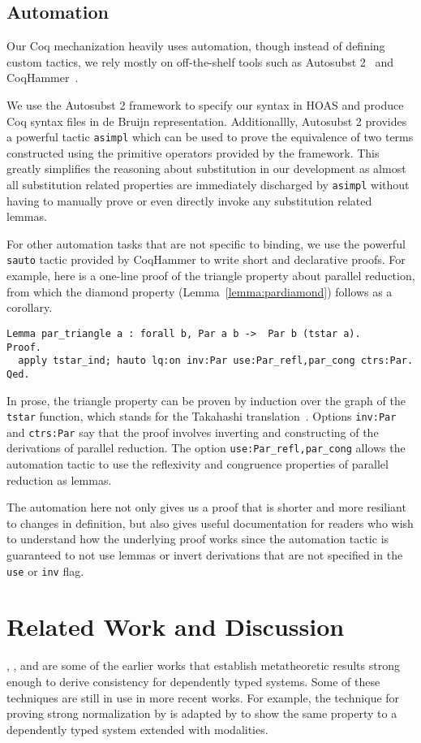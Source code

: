\documentclass[acmsmall]{acmart}
\begin{document}
\subsection{Automation}
\label{sec:automation}
Our Coq mechanization heavily uses automation, though instead of
defining custom tactics, we rely mostly on off-the-shelf tools such as
Autosubst 2~\citep{autosubst2} and CoqHammer~\citep{czajka2018hammer}.

We use the Autosubst 2 framework to specify our syntax in HOAS and
produce Coq syntax files in de Bruijn representation. Additionallly,
Autosubst 2 provides a powerful tactic \texttt{asimpl} which
can be used to prove the equivalence of two terms constructed using
the primitive operators provided by the framework. This greatly
simplifies the reasoning about substitution in our development as
almost all substitution related properties are immediately discharged
by \texttt{asimpl} without having to manually prove or even directly invoke any
substitution related lemmas.

For other automation tasks that are not specific to binding, we use
the powerful \texttt{sauto} tactic provided by CoqHammer to write
short and declarative proofs. For example, here is a one-line proof of
the triangle property about parallel reduction, from which the diamond
property (Lemma~\ref{lemma:pardiamond}) follows as a corollary.
\begin{verbatim}
Lemma par_triangle a : forall b, Par a b ->  Par b (tstar a).
Proof.
  apply tstar_ind; hauto lq:on inv:Par use:Par_refl,par_cong ctrs:Par.
Qed.
\end{verbatim}
In prose, the triangle property can be proven by induction over the
graph of the \texttt{tstar} function, which stands for the Takahashi
translation~\citep{takahashi-parallel-reduction}. Options \texttt{inv:Par} and
\texttt{ctrs:Par} say that the proof involves inverting and
constructing of the derivations of parallel
reduction. The option \texttt{use:Par\_refl,par\_cong} allows the
automation tactic to use
the reflexivity and congruence properties of parallel
reduction as lemmas.

The automation here not only gives us a proof that is shorter and more
resiliant to changes in definition, but also gives useful
documentation for readers who wish to understand how the underlying
proof works since the automation tactic is guaranteed to not use
lemmas or invert derivations that are not specified in the
\texttt{use} or \texttt{inv} flag.


\section{Related Work and Discussion}
\label{sec:relatedwork}
\citet{Martin-Lof-1973}, \citet{geuvers1994short}, and
\citet{barendregt:lambda-calculi-with-types} are some of the earlier
works that establish metatheoretic results strong enough to derive
consistency for dependently typed systems. Some of these techniques
are still in use in more recent works. For example, the technique for
proving strong normalization by \citet{geuvers1994short} is adapted by
\citet{moon2021graded} to show the same property to a dependently
typed system extended with modalities.
\end{document}
